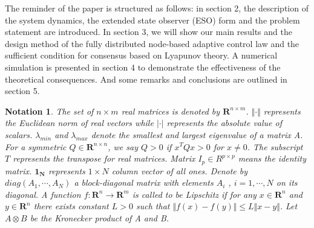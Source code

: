 \documentclass[english]{cccconf}
\newtheorem{notation}{Notation}
\begin{document}
The reminder of the paper is structured as follows: in section 2, the description of the system dynamics, the extended state observer (ESO) form and the problem statement are introduced. In section 3, we will show our main results and the design method of the fully distributed node-based adaptive control law and the sufficient condition for consensus based on Lyapunov theory. A numerical simulation is presented in section 4 to demonstrate the effectiveness of the theoretical consequences. And some remarks and conclusions are outlined in section 5. 

\begin{notation}

The set of $n \times m$ real matrices is denoted by $\mathbf R^{n \times m}$. $\Vert \cdot \Vert$ represents the Euclidean norm of real vectors while $\vert \cdot \vert$ represents the absolute value of scalars. $\lambda_{min}$ and $\lambda_{max}$ denote the smallest and largest eigenvalue of a matrix A. For a symmetric $Q \in \mathbf R^{n \times n}$, we say $Q > 0$ if $x^{T} Q x > 0$ for $x \neq 0$. The subscript $T$ represents the transpose for real matrices. Matrix $I_p \in R^{p \times p}$ means the identity matrix. $\mathbf 1_{\mathbf N}$ represents $1 \times N$ column vector of all ones. Denote by $diag(A_1, \cdots , A_N)$ a block-diagonal matrix with elements $A_i$ , $i = 1, \cdots, N$ on its diagonal.  A function $f: \mathbf R^n \to \mathbf R^m$ is called to be Lipschitz if for any $x \in \mathbf R^n$ and $y \in \mathbf R^n$ there exists constant $L > 0$ such that $\Vert f(x) - f(y) \Vert \le L \Vert x-y \Vert$. Let $A \otimes B$ be the Kronecker product of A and B. 

\end{notation}



     


\end{document}
